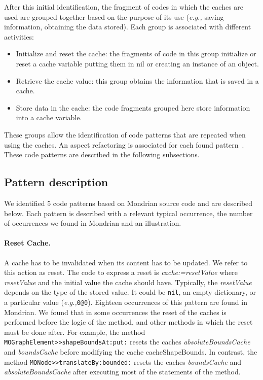 \documentclass[preprint,10pt]{sigplanconf}
\newcommand{\ct}{\lstinline[backgroundcolor=\color{white},basicstyle=\footnotesize\ttfamily]}
\newcommand{\ab}[1]{\nb{Alexandre}{blue}{#1}}
\newcommand{\sv}[1]{\nb{Santiago}{orange}{#1}}
\newcommand{\eg}{\emph{e.g.,}\xspace}
\newcommand{\seclabel}[1]{\label{sec:#1}}
\begin{document}
After this initial identification, the fragment of codes in which the caches are used
are grouped together based on the purpose of its use (\eg saving information, obtaining the data stored). Each group is associated with different activities:
\begin{itemize}
\item Initialize and reset the cache: the fragments of code in this group initialize or reset a cache variable putting them in nil or creating an instance of an object.
\item Retrieve the cache value: this group obtains the information that is saved in a cache.
\item Store data in the cache: the code fragments grouped here store information into a cache variable.
\end{itemize}

These groups allow the identification of code patterns that are
repeated when using the caches. An aspect refactoring is associated for each found pattern~\cite{Kellens2007}. These code patterns are described in the following subsections.

\subsection{Pattern description}\seclabel{Pattern-Identification}


We identified 5 code patterns based on Mondrian source code and are described below.
Each pattern is described with a relevant typical occurrence,
the number of occurrences we found in Mondrian and an illustration.

\paragraph{Reset Cache.} A cache has to be invalidated when its content has to be updated. We refer to this action as reset. The code to express a reset is \emph{cache:=resetValue} where
\emph{resetValue} and the initial value the cache should have. Typically, the \emph{resetValue} depends on the type of the stored value. It could be \ct{nil}, an empty dictionary, or a particular value (\eg \ct{0@0}).
Eighteen occurrences of this pattern are found in Mondrian. 
We found that in some occurrences the reset of the caches is performed before the logic of the method, and other methods in which the reset must be done after. For example, the method \ct{MOGraphElement>>shapeBoundsAt:put:} resets the caches \emph{absoluteBoundsCache} and \emph{boundsCache} before modifying the cache cacheShapeBounds. In contrast, the method \ct{MONode>>translateBy:bounded:} resets the caches \emph{boundsCache} and \emph{absoluteBoundsCache} after executing most of the statements of the method. 
\end{document}

